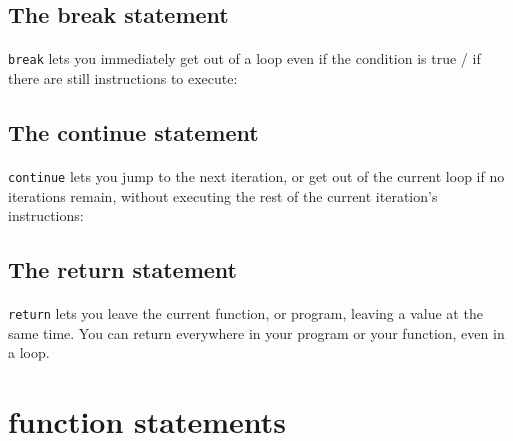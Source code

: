 \documentclass{article}
\begin{document}
\begin{sloppypar}
      
   
   

\subsection{ The break statement}


\paragraph{}
\verb!break! lets you immediately get out of a loop even if the condition is true / if there are still instructions to execute:
      
      {}
   
   
   

\subsection{ The continue statement}


\paragraph{}
\verb!continue! lets you jump to the next iteration, or get out of the current loop if no iterations remain, without executing the rest of the current iteration's instructions:

      {}
   
   
   

\subsection{ The return statement}


\paragraph{}
\verb!return! lets you leave the current function, or program, leaving a value at the same time. You can return everywhere in your program or your function, even in a loop.
      
      {}
   




\section{ function statements}



\end{sloppypar}
\end{document}
